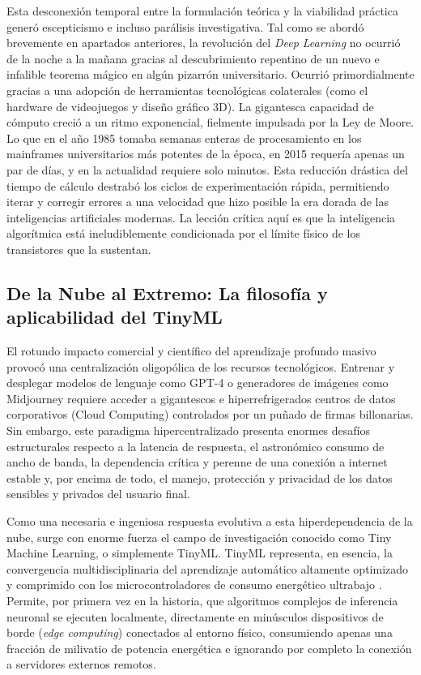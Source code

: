 \documentclass[12pt,letterpaper]{article}
\begin{document}
Esta desconexión temporal entre la formulación teórica y la viabilidad práctica generó escepticismo e incluso parálisis investigativa. Tal como se abordó brevemente en apartados anteriores, la revolución del \textit{Deep Learning} no ocurrió de la noche a la mañana gracias al descubrimiento repentino de un nuevo e infalible teorema mágico en algún pizarrón universitario. Ocurrió primordialmente gracias a una adopción de herramientas tecnológicas colaterales (como el hardware de videojuegos y diseño gráfico 3D). La gigantesca capacidad de cómputo creció a un ritmo exponencial, fielmente impulsada por la Ley de Moore. Lo que en el año 1985 tomaba semanas enteras de procesamiento en los mainframes universitarios más potentes de la época, en 2015 requería apenas un par de días, y en la actualidad requiere solo minutos. Esta reducción drástica del tiempo de cálculo destrabó los ciclos de experimentación rápida, permitiendo iterar y corregir errores a una velocidad que hizo posible la era dorada de las inteligencias artificiales modernas. La lección crítica aquí es que la inteligencia algorítmica está ineludiblemente condicionada por el límite físico de los transistores que la sustentan.

\subsection{De la Nube al Extremo: La filosofía y aplicabilidad del TinyML}
El rotundo impacto comercial y científico del aprendizaje profundo masivo provocó una centralización oligopólica de los recursos tecnológicos. Entrenar y desplegar modelos de lenguaje como GPT-4 o generadores de imágenes como Midjourney requiere acceder a gigantescos e hiperrefrigerados centros de datos corporativos (Cloud Computing) controlados por un puñado de firmas billonarias. Sin embargo, este paradigma hipercentralizado presenta enormes desafíos estructurales respecto a la latencia de respuesta, el astronómico consumo de ancho de banda, la dependencia crítica y perenne de una conexión a internet estable y, por encima de todo, el manejo, protección y privacidad de los datos sensibles y privados del usuario final.

Como una necesaria e ingeniosa respuesta evolutiva a esta hiperdependencia de la nube, surge con enorme fuerza el campo de investigación conocido como Tiny Machine Learning, o simplemente TinyML. TinyML representa, en esencia, la convergencia multidisciplinaria del aprendizaje automático altamente optimizado y comprimido con los microcontroladores de consumo energético ultrabajo \citep{warden2019tinyml}. Permite, por primera vez en la historia, que algoritmos complejos de inferencia neuronal se ejecuten localmente, directamente en minúsculos dispositivos de borde (\textit{edge computing}) conectados al entorno físico, consumiendo apenas una fracción de milivatio de potencia energética e ignorando por completo la conexión a servidores externos remotos.
\end{document}
